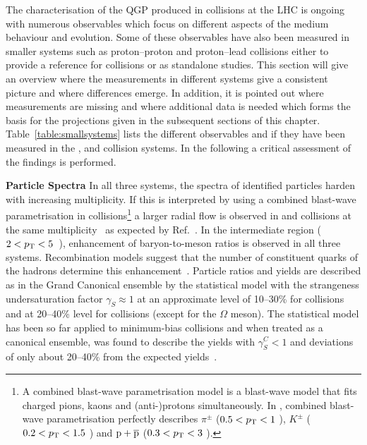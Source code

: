 \documentclass[../report.tex]{subfiles}
\begin{document}
The characterisation of the QGP produced in \PbPb collisions at the LHC is ongoing with numerous observables which focus on different aspects of the medium behaviour and evolution. Some of these observables have also been measured in smaller systems such as proton--proton and proton--lead collisions either to provide a reference for \PbPb collisions or as standalone studies. This section will give an overview where the measurements in different systems give a consistent picture and where differences emerge. In addition, it is pointed out where measurements are missing and where additional data is needed which forms the basis for the projections given in the subsequent sections of this chapter. Table~\ref{table:smallsystems} lists the different observables and if they have been measured in the \PbPb, \pPb and \pp collision systems. In the following a critical assessment of the findings is performed.


\textbf{Particle Spectra}
In all three systems, the \pT spectra of identified particles harden with increasing multiplicity. If this is interpreted by using a combined blast-wave parametrisation in \PbPb collisions\footnote{A combined blast-wave parametrisation model is a blast-wave model that fits charged pions, kaons and (anti-)protons simultaneously. In \cite{Abelev:2012wca}, combined blast-wave parametrisation perfectly describes $\pi^{\pm}$ ($ 0.5 < p\sb{\scriptstyle\mathrm{T}} < 1$ \UGeVc), $K^{\pm}$ ($ 0.2 < p\sb{\scriptstyle\mathrm{T}} < 1.5$ \UGeVc) and ${\rm p}+\overline{\rm{p}}$ ($ 0.3 < p\sb{\scriptstyle\mathrm{T}} < 3$ \UGeVc).} a larger radial flow is observed in \pp and \pPb collisions at the same multiplicity~\cite{Acharya:2018orn} as expected by Ref.~\cite{Shuryak:2013ke}. In the intermediate \pT region ($2 < p\sb{\scriptstyle\mathrm{T}} < 5 $~\UGeVc), enhancement of baryon-to-meson ratios is observed in all three systems. Recombination models suggest that the number of constituent quarks of the hadrons determine this enhancement~\cite{Andrei:2014vaa,Abelev:2013xaa,Abelev:2013haa,Abelev:2014uua,Khachatryan:2016yru,Adam:2015jca,Adam:2016dau,Adam:2017zbf}. Particle ratios and yields are described as in the Grand Canonical ensemble by the statistical model with the strangeness undersaturation factor $\gamma_{S}\approx 1$ at an approximate level of 10--30\% for \PbPb collisions and at 20--40\% level for \pPb collisions (except for the $\Omega$ meson). The statistical model has been so far applied to minimum-bias \pp collisions and when treated as a canonical ensemble, was found to describe the yields with $\gamma^{C}_{S} < 1$ and deviations of only about 20--40\% from the expected yields~\cite{Adam:2016emw,Adam:2016bpr,Adam:2015vsf,ABELEV:2013zaa}.
\end{document}
